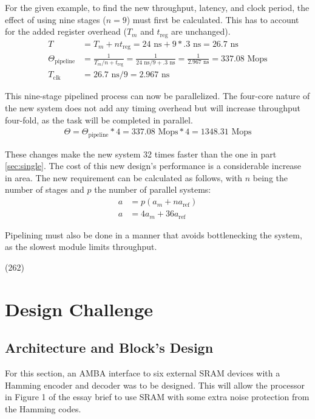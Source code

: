 \documentclass[11pt]{article}
\begin{document}
For the given example, to find the new throughput, latency, and clock period,
the effect of using nine stages ($n = 9$) must first be calculated.
This has to account for the added register overhead\cite{dally} ($T_m$ and $t_{\text{reg}}$ are unchanged).
\begin{align}
    T &= T_m + nt_{\text{reg}} = 24\text{ ns} + 9*.3\text{ ns} = 26.7\text{ ns}\\
    \Theta_{\text{pipeline}} &= \frac{1}{T_m/n+t_{\text{reg}}} = \frac{1}{24\text{ ns}/9+.3\text{ ns}} = \frac{1}{2.967\text{ ns}} = 337.08\text{ Mops}\\
    T_{\text{clk}} &=  26.7\text{ ns} / 9 = 2.967\text{ ns}
\end{align}

This nine-stage pipelined process can now be parallelized.
The four-core nature of the new system does not add any timing overhead but will increase throughput four-fold, as the task will be completed in parallel.
\begin{align}
    \Theta = \Theta_{\text{pipeline}} * 4 = 337.08\text{ Mops} * 4 = 1348.31 \text{ Mops}
\end{align}

These changes make the new system 32 times faster than the one in part \ref{sec:single}.
The cost of this new design's performance is a considerable increase in area.
The new requirement can be calculated as follows, with $n$ being the number of stages and $p$ the number of parallel systems:
\begin{align}
    a &= p(a_m + na_{\text{ref}}) \\ 
    a &= 4a_m + 36a_{\text{ref}}
\end{align}

Pipelining must also be done in a manner that avoids bottlenecking the system, as the slowest module limits throughput.

(262)

\section{Design Challenge}
\subsection{Architecture and Block's Design} \label{sec:block}
For this section, an AMBA interface to six external SRAM devices with a Hamming encoder and decoder was to be designed.
This will allow the processor in Figure 1 of the essay brief to use SRAM with some extra noise protection from the Hamming codes.
\end{document}
